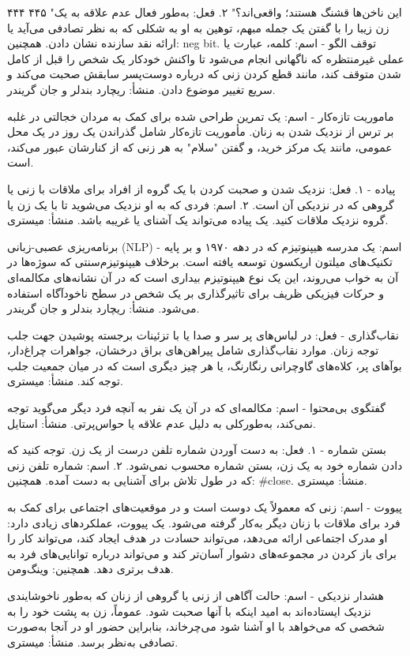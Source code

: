 ۴۴۴ ۴۴۵ "این ناخن‌ها قشنگ هستند؛ واقعی‌اند؟" ۲. فعل: به‌طور فعال عدم علاقه به یک زن زیبا را با گفتن یک جمله مبهم، توهین به او به شکلی که به نظر تصادفی می‌آید یا ارائه نقد سازنده نشان دادن. همچنین: neg bit. توقف الگو - اسم: کلمه، عبارت یا عملی غیرمنتظره که ناگهانی انجام می‌شود تا واکنش خودکار یک شخص را قبل از کامل شدن متوقف کند، مانند قطع کردن زنی که درباره دوست‌پسر سابقش صحبت می‌کند و سریع تغییر موضوع دادن. منشأ: ریچارد بندلر و جان گریندر.

ماموریت تازه‌کار - اسم: یک تمرین طراحی شده برای کمک به مردان خجالتی در غلبه بر ترس از نزدیک شدن به زنان. مأموریت تازه‌کار شامل گذراندن یک روز در یک محل عمومی، مانند یک مرکز خرید، و گفتن "سلام" به هر زنی که از کنارشان عبور می‌کند، است.

پیاده - ۱. فعل: نزدیک شدن و صحبت کردن با یک گروه از افراد برای ملاقات با زنی یا گروهی که در نزدیکی آن است. ۲. اسم: فردی که به او نزدیک می‌شوید تا با یک زن یا گروه نزدیک ملاقات کنید. یک پیاده می‌تواند یک آشنای یا غریبه باشد. منشأ: میستری.

برنامه‌ریزی عصبی-زبانی (NLP) - اسم: یک مدرسه‌ هیپنوتیزم که در دهه ۱۹۷۰ و بر پایه تکنیک‌های میلتون اریکسون توسعه یافته است. برخلاف هیپنوتیزم‌سنتی که سوژه‌ها در آن به خواب می‌روند، این یک نوع هیپنوتیزم بیداری است که در آن نشانه‌های مکالمه‌ای و حرکات فیزیکی ظریف برای تاثیرگذاری بر یک شخص در سطح ناخودآگاه استفاده می‌شود. منشأ: ریچارد بندلر و جان گریندر.

نقاب‌گذاری - فعل: در لبا‌س‌های پر سر و صدا یا با تزئینات برجسته پوشیدن جهت جلب توجه زنان. موارد نقاب‌گذاری شامل پیراهن‌های براق درخشان، جواهرات چراغ‌دار، بوآهای پر، کلاه‌های گاوچرانی رنگارنگ، یا هر چیز دیگری است که در میان جمعیت جلب توجه کند. منشأ: میستری.

گفتگوی بی‌محتوا - اسم: مکالمه‌ای که در آن یک نفر به آنچه فرد دیگر می‌گوید توجه نمی‌کند، به‌طورکلی به دلیل عدم علاقه یا حواس‌پرتی. منشأ: استایل.

بستن شماره - ۱. فعل: به دست آوردن شماره تلفن درست از یک زن. توجه کنید که دادن شماره خود به یک زن، بستن شماره محسوب نمی‌شود. ۲. اسم: شماره تلفن زنی که در طول تلاش برای آشنایی به دست آمده. همچنین: #close. منشأ: میستری.

پیووت - اسم: زنی که معمولاً یک دوست است و در موقعیت‌های اجتماعی برای کمک به فرد برای ملاقات با زنان دیگر به‌کار گرفته می‌شود. یک پیووت، عملکردهای زیادی دارد: او مدرک اجتماعی ارائه می‌دهد، می‌تواند حسادت در هدف ایجاد کند، می‌تواند کار را برای باز کردن در مجموعه‌های دشوار آسان‌تر کند و می‌تواند درباره توانایی‌های فرد به هدف برتری دهد. همچنین: وینگ‌ومن.

هشدار نزدیکی - اسم: حالت آگاهی از زنی یا گروهی از زنان که به‌طور ناخوشایندی نزدیک ایستاده‌اند به امید اینکه با آنها صحبت شود. عموماً، زن به پشت خود را به شخصی که می‌خواهد با او آشنا شود می‌چرخاند، بنابراین حضور او در آنجا به‌صورت تصادفی به‌نظر برسد. منشأ: میستری.

